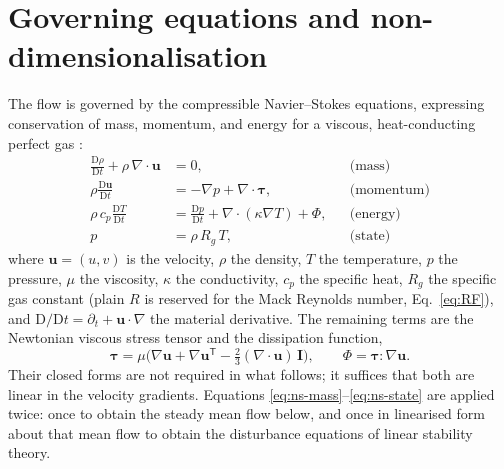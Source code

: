 \documentclass[11pt]{article}
\providecommand{\Dmat}{\mathrm{D}}
\begin{document}
\section{Governing equations and non-dimensionalisation}\label{sec:gov}
The flow is governed by the compressible Navier--Stokes equations, expressing conservation of mass,
momentum, and energy for a viscous, heat-conducting perfect gas \cite{white2006}:
\begin{align}
  \frac{\Dmat\rho}{\Dmat t}+\rho\,\nabla\!\cdot\!\mathbf u &= 0, &&\text{(mass)}\label{eq:ns-mass}\\
  \rho\frac{\Dmat\mathbf u}{\Dmat t} &= -\nabla p+\nabla\!\cdot\!\boldsymbol\tau, &&\text{(momentum)}\label{eq:ns-mom}\\
  \rho\,c_p\frac{\Dmat T}{\Dmat t} &= \frac{\Dmat p}{\Dmat t}+\nabla\!\cdot(\kappa\nabla T)+\Phi, &&\text{(energy)}\label{eq:ns-energy}\\
  p &= \rho\,R_g\,T, &&\text{(state)}\label{eq:ns-state}
\end{align}
where $\mathbf u=(u,v)$ is the velocity, $\rho$ the density, $T$ the temperature, $p$ the pressure, $\mu$
the viscosity, $\kappa$ the conductivity, $c_p$ the specific heat, $R_g$ the specific gas constant (plain
$R$ is reserved for the Mack Reynolds number, Eq.~\eqref{eq:RF}), and
$\Dmat/\Dmat t=\partial_t+\mathbf u\!\cdot\!\nabla$ the material derivative. The remaining terms are the
Newtonian viscous stress tensor and the dissipation function,
\begin{equation}\label{eq:tauphi}
  \boldsymbol\tau=\mu\Big(\nabla\mathbf u+\nabla\mathbf u^{\mathsf T}-\tfrac23(\nabla\!\cdot\!\mathbf u)\,\mathbf I\Big),
  \qquad \Phi=\boldsymbol\tau\!:\!\nabla\mathbf u .
\end{equation}
Their closed forms are not required in what follows; it suffices that both are linear in the velocity
gradients. Equations \eqref{eq:ns-mass}--\eqref{eq:ns-state} are applied twice: once to obtain the steady
mean flow below, and once in linearised form about that mean flow to obtain the disturbance equations
of linear stability theory.
\end{document}

